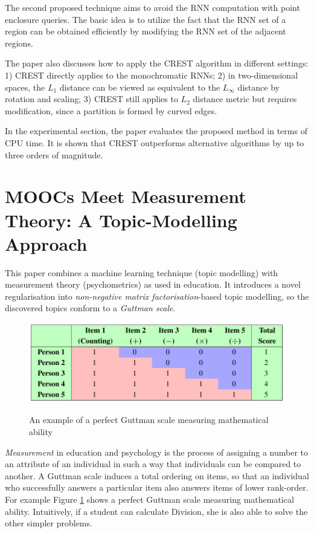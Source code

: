 \documentclass[paper=a4, fontsize=18pt]{article} %
\numberwithin{equation}{section} %
\numberwithin{figure}{section} %
\numberwithin{table}{section} %
\begin{document}
The second proposed technique aims to avoid the RNN computation with point enclosure queries. The basic idea is to utilize the fact that the RNN set of a region can be obtained efficiently by modifying the RNN set of the adjacent regions.

The paper also discusses how to apply the CREST algorithm in different settings: 1) CREST directly applies to the monochromatic RNNs; 2) in two-dimensional spaces, the $L_1$ distance can be viewed as equivalent to the $L_\infty$ distance by rotation and scaling; 3) CREST still applies to $L_2$ distance metric but requires modification, since a partition is formed by curved edges.

In the experimental section, the paper evaluates the proposed method in terms of CPU time. It is shown that CREST outperforms alternative algorithms by up to three orders of magnitude.

\section{MOOCs Meet Measurement Theory: A Topic-Modelling Approach \cite{HRBZMC16}}

This paper combines a machine learning technique (topic modelling) with measurement theory (psychometrics) as used in education. It introduces a novel regularisation into \emph{non-negative matrix factorisation}-based topic modelling, so the discovered topics conform to a \emph{Guttman scale}.

\begin{figure}[h]
  \centering
  \includegraphics[width=.8\linewidth]{8_22_Guttman.png}\\
  \caption{An example of a perfect Guttman scale measuring mathematical ability}\label{fig:Guttman}
\end{figure}


\emph{Measurement} in education and psychology is the process of assigning a number to an attribute of an individual in such a way that individuals can be compared to another. A Guttman scale induces a total ordering on items, so that an individual who successfully answers a particular item also answers items of lower rank-order. For example Figure \ref{fig:Guttman} shows a perfect Guttman scale measuring mathematical ability. Intuitively, if a student can calculate Division, she is also able to solve the other simpler problems.
\end{document}
